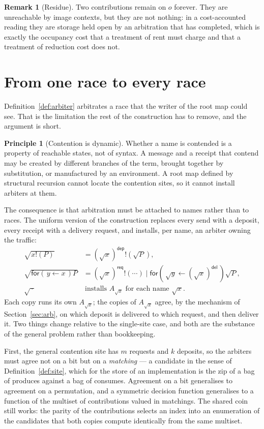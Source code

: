 \documentclass[11pt]{article}
\theoremstyle{definition}
\newtheorem{remark}[theorem]{Remark}
\newtheorem{principle}[theorem]{Principle}
\newcommand{\In}[2]{\mathsf{for}(\,#1 \leftarrow #2\,)}
\newcommand{\rt}[1]{\sqrt{#1}}
\begin{document}
\begin{remark}[Residue]
Two contributions remain on $o$ forever. They are unreachable by image contexts, but they are not nothing: in a cost-accounted reading they are storage held open by an arbitration that has completed, which is exactly the occupancy cost that a treatment of rent must charge and that a treatment of reduction cost does not.
\end{remark}

\section{From one race to every race}\label{sec:every}

Definition~\ref{def:arbiter} arbitrates a race that the writer of the root map could see. That is the limitation the rest of the construction has to remove, and the argument is short.

\begin{principle}[Contention is dynamic]
Whether a name is contended is a property of reachable states, not of syntax. A message and a receipt that contend may be created by different branches of the term, brought together by substitution, or manufactured by an environment. A root map defined by structural recursion cannot locate the contention sites, so it cannot install arbiters at them.
\end{principle}

The consequence is that arbitration must be attached to names rather than to races. The uniform version of the construction replaces every send with a deposit, every receipt with a delivery request, and installs, per name, an arbiter owning the traffic:
\begin{align*}
  \rt{x!(P)} &= (\rt{x})^{\mathsf{dep}}!(\rt{P}), \\
  \rt{\In{y}{x}P} &= (\rt{x})^{\mathsf{req}}!(\cdots) \mid \In{\rt{y}}{(\rt{x})^{\mathsf{del}}}\rt{P}, \\
  \rt{\,\cdot\,} &\ \text{installs } A_{\rt{x}} \text{ for each name } \rt{x} .
\end{align*}
Each copy runs its own $A_{\rt{x}}$; the copies of $A_{\rt{x}}$ agree, by the mechanism of Section~\ref{sec:arb}, on which deposit is delivered to which request, and then deliver it. Two things change relative to the single-site case, and both are the substance of the general problem rather than bookkeeping.

First, the general contention site has $m$ requests and $k$ deposits, so the arbiters must agree not on a bit but on a \emph{matching} --- a candidate in the sense of Definition~\ref{def:site}, which for the store of an implementation is the zip of a bag of produces against a bag of consumes. Agreement on a bit generalises to agreement on a permutation, and a symmetric decision function generalises to a function of the multiset of contributions valued in matchings. The shared coin still works: the parity of the contributions selects an index into an enumeration of the candidates that both copies compute identically from the same multiset.
\end{document}
